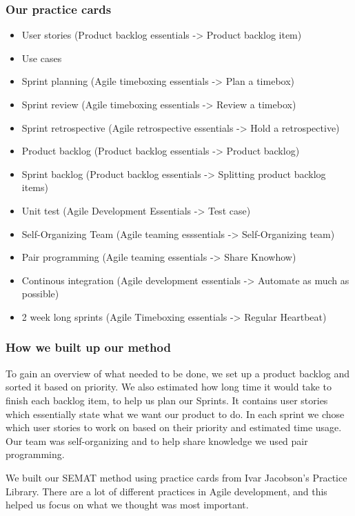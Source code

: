 \subsubsection{Our practice cards}
\begin{itemize}
    \item User stories (Product backlog essentials -> Product backlog item)
    \item Use cases
    \item Sprint planning (Agile timeboxing essentials -> Plan a timebox)
    \item Sprint review (Agile timeboxing essentials -> Review a timebox)
    \item Sprint retrospective (Agile retrospective essentials -> Hold a retrospective)
    \item Product backlog (Product backlog essentials -> Product backlog)
    \item Sprint backlog (Product backlog essentials -> Splitting product backlog items)
    \item Unit test (Agile Development Essentials -> Test case)
    \item Self-Organizing Team (Agile teaming esssentials -> Self-Organizing team)
    \item Pair programming (Agile teaming essentials -> Share Knowhow)
    \item Continous integration (Agile development essentials -> Automate as much as possible)
    \item 2 week long sprints (Agile Timeboxing essentials -> Regular Heartbeat)
\end{itemize}

\subsubsection{How we built up our method}
To gain an overview of what needed to be done, we set up a product backlog and sorted it based on priority. We also estimated how long time it would take to finish each backlog item, to help us plan our Sprints. It contains user stories which essentially state what we want our product to do. In each sprint we chose which user stories to work on based on their priority and estimated time usage. Our team was self-organizing and to help share knowledge we used pair programming.

We built our SEMAT method using practice cards from Ivar Jacobson's Practice Library. There are a lot of different practices in Agile development, and this helped us focus on what we thought was most important.

